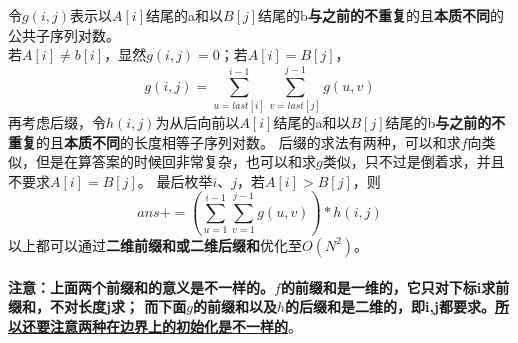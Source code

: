         令$g(i,j)$表示以$A[i]$结尾的a和以$B[j]$结尾的b\textbf{与之前的不重复}的且\textbf{本质不同}的公共子序列对数。\\
        若$A[i]\neq b[i]$，显然$g(i,j)=0$；若$A[i]=B[j]$，
        $$g(i,j)=\sum_{u=last[i]}^{i-1}{\sum_{v=last[j]}^{j-1}{g(u,v)}}$$
        再考虑后缀，令$h(i,j)$为从后向前以$A[i]$结尾的a和以$B[j]$结尾的b\textbf{与之前的不重复}的且\textbf{本质不同}的长度相等子序列对数。
        后缀的求法有两种，可以和求$f$向类似，但是在算答案的时候回非常复杂，也可以和求$g$类似，只不过是倒着求，并且不要求$A[i]=B[j]$。
        最后枚举$i$、$j$，若$A[i]>B[j]$，则
        $$ans+=(\sum_{u=1}^{i-1}{\sum_{v=1}^{j-1}{g(u,v)}})*h(i,j)$$
        以上都可以通过\textbf{二维前缀和或二维后缀和}优化至$O(N^2)$。\\\\
        \textbf{注意：上面两个前缀和的意义是不一样的。$f$的前缀和是一维的，它只对下标i求前缀和，不对长度j求；
        而下面$g$的前缀和以及$h$的后缀和是二维的，即i,j都要求。\underline{所以还要注意两种在边界上的初始化是不一样的}}。
